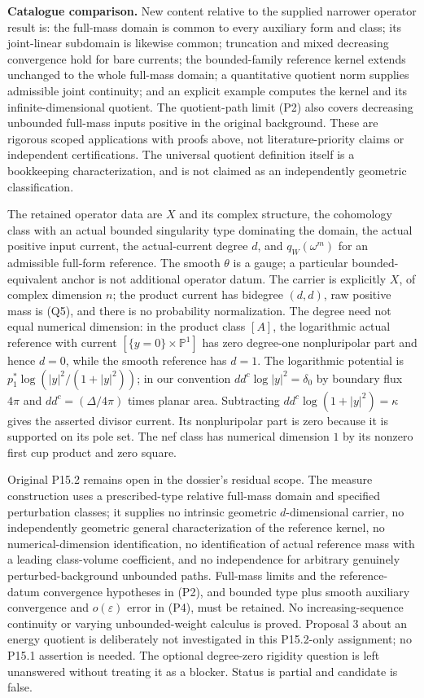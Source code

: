 \documentclass[
  11pt,
]{article}
\begin{document}
\textbf{Catalogue comparison.} New content relative to the supplied
narrower operator result is: the full-mass domain is common to every
auxiliary form and class; its joint-linear subdomain is likewise common;
truncation and mixed decreasing convergence hold for bare currents; the
bounded-family reference kernel extends unchanged to the whole full-mass
domain; a quantitative quotient norm supplies admissible joint
continuity; and an explicit example computes the kernel and its
infinite-dimensional quotient. The quotient-path limit (P2) also covers
decreasing unbounded full-mass inputs positive in the original
background. These are rigorous scoped applications with proofs above,
not literature-priority claims or independent certifications. The
universal quotient definition itself is a bookkeeping characterization,
and is not claimed as an independently geometric classification.

The retained operator data are \(X\) and its complex structure, the
cohomology class with an actual bounded singularity type dominating the
domain, the actual positive input current, the actual-current degree
\(d\), and \(q_W(\omega^m)\) for an admissible full-form reference. The
smooth \(\theta\) is a gauge; a particular bounded-equivalent anchor is
not additional operator datum. The carrier is explicitly \(X\), of
complex dimension \(n\); the product current has bidegree \((d,d)\), raw
positive mass is (Q5), and there is no probability normalization. The
degree need not equal numerical dimension: in the product class \([A]\),
the logarithmic actual reference with current
\([\{y=0\}\times\mathbb{P}^1]\) has zero degree-one nonpluripolar part
and hence \(d=0\), while the smooth reference has \(d=1\). The
logarithmic potential is \(p_1^*\log(|y|^2/(1+|y|^2))\); in our
convention \(dd^c\log|y|^2=\delta_0\) by boundary flux \(4\pi\) and
\(dd^c=(\Delta/4\pi)\) times planar area. Subtracting
\(dd^c\log(1+|y|^2)=\kappa\) gives the asserted divisor current. Its
nonpluripolar part is zero because it is supported on its pole set. The
nef class has numerical dimension \(1\) by its nonzero first cup product
and zero square.

Original P15.2 remains open in the dossier's residual scope. The measure
construction uses a prescribed-type relative full-mass domain and
specified perturbation classes; it supplies no intrinsic geometric
\(d\)-dimensional carrier, no independently geometric general
characterization of the reference kernel, no numerical-dimension
identification, no identification of actual reference mass with a
leading class-volume coefficient, and no independence for arbitrary
genuinely perturbed-background unbounded paths. Full-mass limits and the
reference-datum convergence hypotheses in (P2), and bounded type plus
smooth auxiliary convergence and \(o(\varepsilon)\) error in (P4), must
be retained. No increasing-sequence continuity or varying
unbounded-weight calculus is proved. Proposal 3 about an energy quotient
is deliberately not investigated in this P15.2-only assignment; no P15.1
assertion is needed. The optional degree-zero rigidity question is left
unanswered without treating it as a blocker. Status is partial and
candidate is false.
\end{document}
